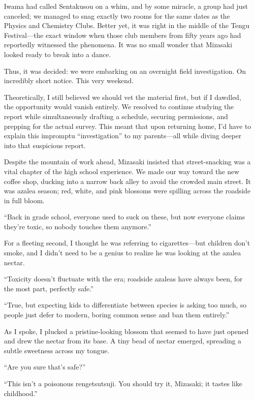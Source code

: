 \documentclass[
    a4paper,
    12pt,
    twoside,
    openany,
    UTF8,
    fontset=windows
]{ctexbook}
\begin{document}
Iwama had called Sentakusou on a whim, and by some miracle, a group had just canceled; we managed to snag exactly two rooms for the same dates as the Physics and Chemistry Clubs. Better yet, it was right in the middle of the Tengu Festival---the exact window when those club members from fifty years ago had reportedly witnessed the phenomena. It was no small wonder that Mizasaki looked ready to break into a dance.

Thus, it was decided: we were embarking on an overnight field investigation. On incredibly short notice. This very weekend.

Theoretically, I still believed we should vet the material first, but if I dawdled, the opportunity would vanish entirely. We resolved to continue studying the report while simultaneously drafting a schedule, securing permissions, and prepping for the actual survey. This meant that upon returning home, I'd have to explain this impromptu ``investigation'' to my parents---all while diving deeper into that suspicious report.

Despite the mountain of work ahead, Mizasaki insisted that street-snacking was a vital chapter of the high school experience. We made our way toward the new coffee shop, ducking into a narrow back alley to avoid the crowded main street. It was azalea season; red, white, and pink blossoms were spilling across the roadside in full bloom.

``Back in grade school, everyone used to suck on these, but now everyone claims they're toxic, so nobody touches them anymore.''

For a fleeting second, I thought he was referring to cigarettes---but children don't smoke, and I didn't need to be a genius to realize he was looking at the azalea nectar.

``Toxicity doesn't fluctuate with the era; roadside azaleas have always been, for the most part, perfectly safe.''

``True, but expecting kids to differentiate between species is asking too much, so people just defer to modern, boring common sense and ban them entirely.''

As I spoke, I plucked a pristine-looking blossom that seemed to have just opened and drew the nectar from its base. A tiny bead of nectar emerged, spreading a subtle sweetness across my tongue.

``Are you sure that's safe?''

``This isn't a poisonous rengetsutsuji. You should try it, Mizasaki; it tastes like childhood.''
\end{document}
